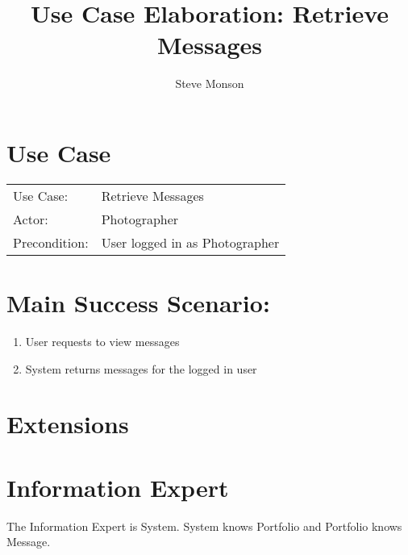 \documentclass{article}
\title{Use Case Elaboration: Retrieve Messages}
\author{ Steve Monson }
\begin{document}
\maketitle


\section*{Use Case}
\begin{tabular}{l l}
Use Case:     & Retrieve Messages\\
Actor:        & Photographer\\
Precondition: & User logged in as Photographer\\
\end{tabular}


\section*{Main Success Scenario:}

\begin{enumerate}
    \item User requests to view messages
    \item System returns messages for the logged in user

\end{enumerate}

\section*{Extensions}

\begin{itemize}
    
                            
\end{itemize}


\section*{Information Expert}

The Information Expert is System. System knows Portfolio and Portfolio knows Message. 
\end{document}
